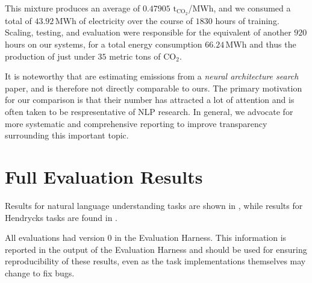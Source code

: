 \documentclass[11pt]{article}
\begin{document}
This mixture produces an average of $0.47905$ $\mathrm{t_{CO_2}}$/MWh, and we consumed a total of $43.92$\,MWh of electricity over the course of $1830$ hours of training. Scaling, testing, and evaluation were responsible for the equivalent of another $920$ hours on our systems, for a total energy consumption $66.24$\,MWh and thus the production of just under $35$ metric tons of $\mathrm{CO_2}$.

It is noteworthy that \citet{strubell2019energy} are estimating emissions from a \textit{neural architecture search} paper, and is therefore not directly comparable to ours. The primary motivation for our comparison is that their number has attracted a lot of attention and is often taken to be respresentative of NLP research. In general, we advocate for more systematic and comprehensive reporting to improve transparency surrounding this important topic.

\section{Full Evaluation Results}\label{app:downstream}

Results for natural language understanding tasks are shown in , while results for Hendrycks tasks are found in .

All evaluations had version 0 in the Evaluation Harness. This information is reported in the output of the Evaluation Harness and should be used for ensuring reproducibility of these results, even as the task implementations themselves may change to fix bugs.

\clearpage
\end{document}

